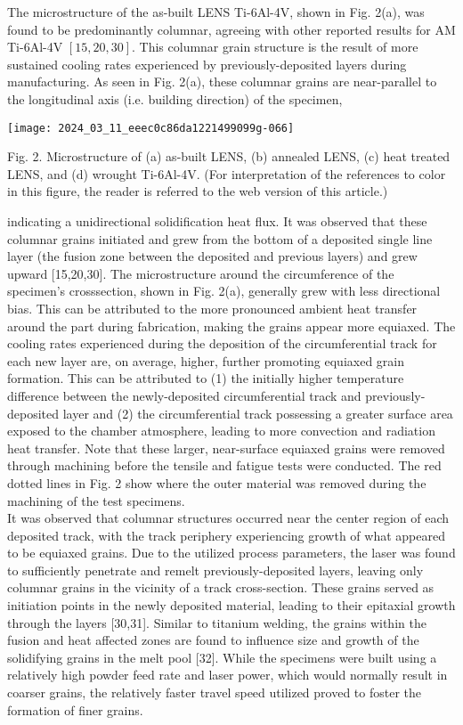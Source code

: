 \documentclass[10pt]{article}
\begin{document}
The microstructure of the as-built LENS Ti-6Al-4V, shown in Fig. 2(a), was found to be predominantly columnar, agreeing with other reported results for AM Ti-6Al-4V $[15,20,30]$. This columnar grain structure is the result of more sustained cooling rates experienced by previously-deposited layers during manufacturing. As seen in Fig. 2(a), these columnar grains are near-parallel to the longitudinal axis (i.e. building direction) of the specimen,

\begin{center}
\texttt{[image: 2024\_03\_11\_eeec0c86da1221499099g-066]}
\end{center}

Fig. 2. Microstructure of (a) as-built LENS, (b) annealed LENS, (c) heat treated LENS, and (d) wrought Ti-6Al-4V. (For interpretation of the references to color in this figure, the reader is referred to the web version of this article.)

indicating a unidirectional solidification heat flux. It was observed that these columnar grains initiated and grew from the bottom of a deposited single line layer (the fusion zone between the deposited and previous layers) and grew upward [15,20,30]. The microstructure around the circumference of the specimen's crosssection, shown in Fig. 2(a), generally grew with less directional bias. This can be attributed to the more pronounced ambient heat transfer around the part during fabrication, making the grains appear more equiaxed. The cooling rates experienced during the deposition of the circumferential track for each new layer are, on average, higher, further promoting equiaxed grain formation. This can be attributed to (1) the initially higher temperature difference between the newly-deposited circumferential track and previously-deposited layer and (2) the circumferential track possessing a greater surface area exposed to the chamber atmosphere, leading to more convection and radiation heat transfer. Note that these larger, near-surface equiaxed grains were removed through machining before the tensile and fatigue tests were conducted. The red dotted lines in Fig. 2 show where the outer material was removed during the machining of the test specimens.\\
It was observed that columnar structures occurred near the center region of each deposited track, with the track periphery experiencing growth of what appeared to be equiaxed grains. Due to the utilized process parameters, the laser was found to sufficiently penetrate and remelt previously-deposited layers, leaving only columnar grains in the vicinity of a track cross-section. These grains served as initiation points in the newly deposited material, leading to their epitaxial growth through the layers [30,31]. Similar to titanium welding, the grains within the fusion and heat affected zones are found to influence size and growth of the solidifying grains in the melt pool [32]. While the specimens were built using a relatively high powder feed rate and laser power, which would normally result in coarser grains, the relatively faster travel speed utilized proved to foster the formation of finer grains.
\end{document}
